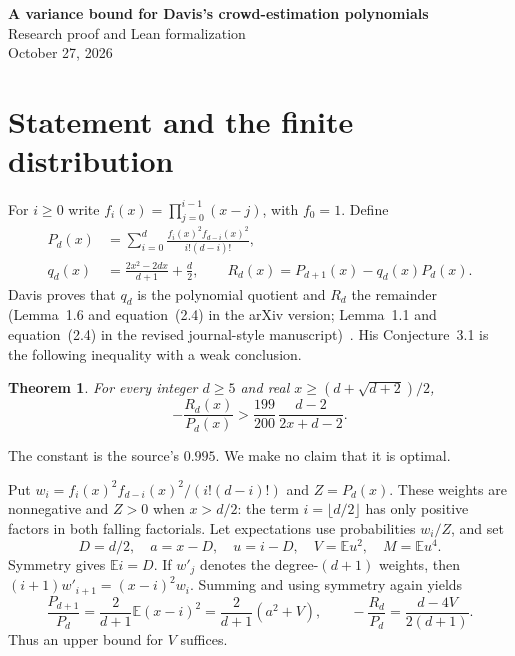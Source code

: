 \documentclass[11pt]{article}
\newtheorem{theorem}{Theorem}
\newcommand{\E}{\mathbb E}
\begin{document}
\begin{center}
{\Large\bfseries A variance bound for Davis's crowd-estimation polynomials}\\[.5em]
Research proof and Lean formalization\\
October 27, 2026
\end{center}
\begin{abstract}
We prove the rational-function bound proposed in Conjecture~3.1 of Davis's
paper on crowd estimation. The inequality holds strictly throughout its
stated domain. The proof rewrites the polynomial quotient as a variance,
derives an exact fourth-moment identity by finite detailed balance, and
uses a quadratic comparison for every integer degree at least~43.
The remaining~38 degrees are covered by exact positive-coefficient
certificates. The source's separate conjecture on critical points is
not addressed.
\end{abstract}

\section{Statement and the finite distribution}
For $i\ge0$ write $f_i(x)=\prod_{j=0}^{i-1}(x-j)$, with $f_0=1$. Define
\begin{align}
 P_d(x)&=\sum_{i=0}^d\frac{f_i(x)^2f_{d-i}(x)^2}{i!(d-i)!},\label{Pd}\\
 q_d(x)&=\frac{2x^2-2dx}{d+1}+\frac d2,
 \qquad R_d(x)=P_{d+1}(x)-q_d(x)P_d(x).\label{remainder}
\end{align}
Davis proves that $q_d$ is the polynomial quotient and $R_d$ the remainder
(Lemma~1.6 and equation~(2.4) in the arXiv version; Lemma~1.1 and
equation~(2.4) in the revised journal-style manuscript)~\cite{Davis}.
His Conjecture~3.1 is the following inequality with a weak conclusion.
\begin{theorem}\label{main}
For every integer $d\ge5$ and real $x\ge(d+\sqrt{d+2})/2$,
\[
 -\frac{R_d(x)}{P_d(x)}>
 \frac{199}{200}\,\frac{d-2}{2x+d-2}.
\]
\end{theorem}
The constant is the source's $0.995$. We make no claim that it is optimal.

Put $w_i=f_i(x)^2f_{d-i}(x)^2/(i!(d-i)!)$ and $Z=P_d(x)$.
These weights are nonnegative and $Z>0$ when $x>d/2$: the term
$i=\lfloor d/2\rfloor$ has only positive factors in both falling
factorials. Let expectations use probabilities $w_i/Z$, and set
\[
 D=d/2,\quad a=x-D,\quad u=i-D,\quad V=\E u^2,\quad M=\E u^4.
\]
Symmetry gives $\E i=D$. If $w'_j$ denotes the degree-$(d+1)$ weights,
then $(i+1)w'_{i+1}=(x-i)^2w_i$. Summing and using symmetry again yields
\begin{equation}\label{variance}
 \frac{P_{d+1}}{P_d}=\frac{2}{d+1}\E(x-i)^2
 =\frac{2}{d+1}(a^2+V),\qquad
 -\frac{R_d}{P_d}=\frac{d-4V}{2(d+1)}.
\end{equation}
Thus an upper bound for $V$ suffices.
\end{document}
